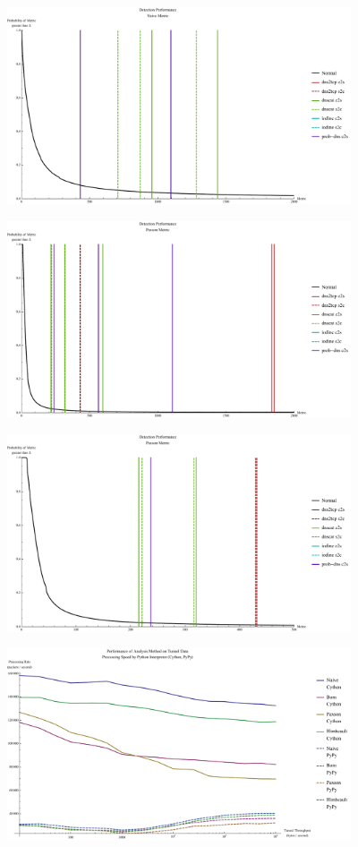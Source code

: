 \documentclass[12pt]{report}
\theoremstyle{remark}
\theoremstyle{definition}
\theoremstyle{definition}
\theoremstyle{definition}
\begin{document}
\begin{figure}
\centering
\includegraphics[width=4in]{figures/mpnv.pdf}
\end{figure}
\begin{figure}
\centering
\includegraphics[width=4in]{figures/mppv.pdf}
\end{figure}
\begin{figure}
\centering
\includegraphics[width=4in]{figures/mppv-500.pdf}
\end{figure}
\begin{figure}
\centering
\includegraphics[width=4in]{figures/pmat.pdf}
\end{figure}
\end{document}
